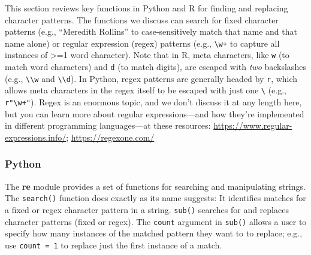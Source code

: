 \documentclass[
]{book}
\begin{document}
This section reviews key functions in Python and R for finding and replacing character patterns. The functions we discuss can search for fixed character patterns (e.g., ``Meredith Rollins'' to case-sensitively match that name and that name alone) or regular expression (regex) patterns (e.g., \texttt{\textbackslash{}w+} to capture all instances of \textgreater=1 word character). Note that in R, meta characters, like \texttt{w} (to match word characters) and \texttt{d} (to match digits), are escaped with \emph{two} backslashes (e.g., \texttt{\textbackslash{}\textbackslash{}w} and \texttt{\textbackslash{}\textbackslash{}d}). In Python, regex patterns are generally headed by \texttt{r}, which allows meta characters in the regex itself to be escaped with just one \texttt{\textbackslash{}} (e.g., \texttt{r"\textbackslash{}w+"}). Regex is an enormous topic, and we don't discuss it at any length here, but you can learn more about regular expressions---and how they're implemented in different programming languages---at these resources: \url{https://www.regular-expressions.info/}; \url{https://regexone.com/}

\hypertarget{python-25}{%
\subsubsection*{Python}\label{python-25}}

The \textbf{re} module provides a set of functions for searching and manipulating strings. The \texttt{search()} function does exactly as its name suggests: It identifies matches for a fixed or regex character pattern in a string. \texttt{sub()} searches for and replaces character patterns (fixed or regex). The \texttt{count} argument in \texttt{sub()} allows a user to specify how many instances of the matched pattern they want to to replace; e.g., use \texttt{count\ =\ 1} to replace just the first instance of a match.
\end{document}

